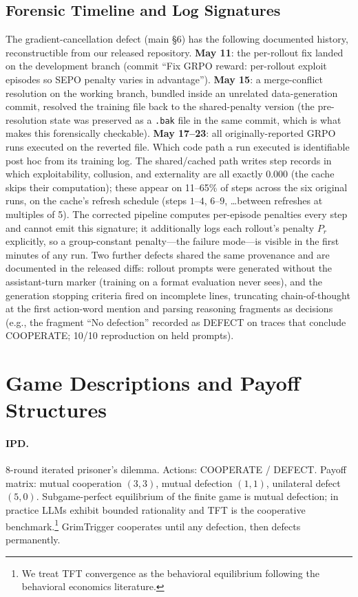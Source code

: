 \documentclass[letterpaper]{article} %
\begin{document}
\subsection{Forensic Timeline and Log Signatures}
\label{app:forensics}
The gradient-cancellation defect (main \S6) has the following documented history, reconstructible from our released repository. \textbf{May 11}: the per-rollout fix landed on the development branch (commit ``Fix GRPO reward: per-rollout exploit episodes so SEPO penalty varies in advantage''). \textbf{May 15}: a merge-conflict resolution on the working branch, bundled inside an unrelated data-generation commit, resolved the training file back to the shared-penalty version (the pre-resolution state was preserved as a \texttt{.bak} file in the same commit, which is what makes this forensically checkable). \textbf{May 17--23}: all originally-reported GRPO runs executed on the reverted file.
Which code path a run executed is identifiable post hoc from its training log. The shared/cached path writes step records in which exploitability, collusion, and externality are all exactly $0.000$ (the cache skips their computation); these appear on 11--65\% of steps across the six original runs, on the cache's refresh schedule (steps $1$--$4$, $6$--$9$, \ldots between refreshes at multiples of 5). The corrected pipeline computes per-episode penalties every step and cannot emit this signature; it additionally logs each rollout's penalty $P_r$ explicitly, so a group-constant penalty---the failure mode---is visible in the first minutes of any run. Two further defects shared the same provenance and are documented in the released diffs: rollout prompts were generated without the assistant-turn marker (training on a format evaluation never sees), and the generation stopping criteria fired on incomplete lines, truncating chain-of-thought at the first action-word mention and parsing reasoning fragments as decisions (e.g., the fragment ``No defection'' recorded as DEFECT on traces that conclude COOPERATE; 10/10 reproduction on held prompts).
\section{Game Descriptions and Payoff Structures}
\label{app:games}
\paragraph{IPD.} 8-round iterated prisoner's dilemma. Actions: COOPERATE / DEFECT. Payoff matrix: mutual cooperation $(3,3)$, mutual defection $(1,1)$, unilateral defect $(5,0)$. Subgame-perfect equilibrium of the finite game is mutual defection; in practice LLMs exhibit bounded rationality and TFT is the cooperative benchmark.\footnote{We treat TFT convergence as the behavioral equilibrium following the behavioral economics literature.} GrimTrigger cooperates until any defection, then defects permanently.
\end{document}
